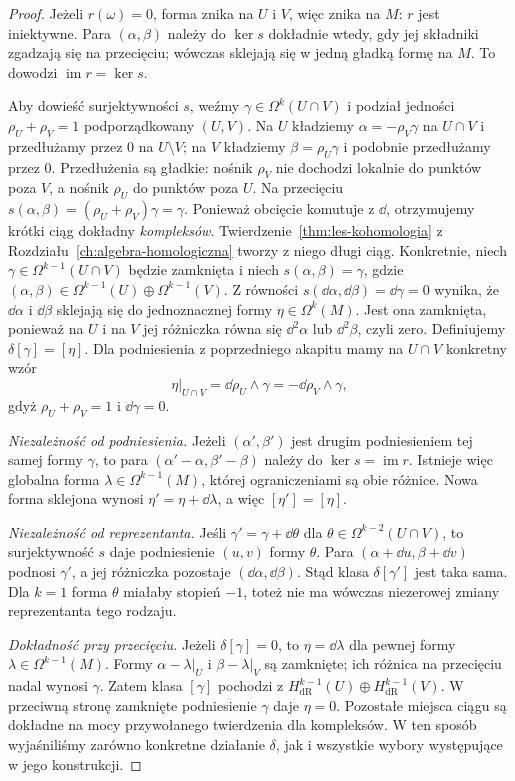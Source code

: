 \begin{proof}
Jeżeli $r(\omega)=0$, forma znika na $U$ i $V$,
więc znika na $M$: $r$ jest iniektywne.
Para $(\alpha,\beta)$ należy do $\ker s$ dokładnie
wtedy, gdy jej składniki zgadzają się na przecięciu;
wówczas sklejają się w jedną gładką formę na $M$.
To dowodzi $\operatorname{im}r=\ker s$.

Aby dowieść surjektywności $s$, weźmy
$\gamma\in\Omega^k(U\cap V)$ i podział jedności
$\rho_U+\rho_V=1$ podporządkowany $(U,V)$.
Na $U$ kładziemy $\alpha=-\rho_V\gamma$ na
$U\cap V$ i przedłużamy przez $0$ na $U\setminus V$;
na $V$ kładziemy $\beta=\rho_U\gamma$
i podobnie przedłużamy przez $0$.
Przedłużenia są gładkie: nośnik $\rho_V$ nie
dochodzi lokalnie do punktów poza $V$, a nośnik
$\rho_U$ do punktów poza $U$. Na przecięciu
$s(\alpha,\beta)=(\rho_U+\rho_V)\gamma=\gamma$.
Ponieważ obcięcie komutuje z $\dd$, otrzymujemy
krótki ciąg dokładny \emph{kompleksów}.
Twierdzenie~\ref{thm:les-kohomologia} z
Rozdziału~\ref{ch:algebra-homologiczna} tworzy
z niego długi ciąg. Konkretnie, niech
$\gamma\in\Omega^{k-1}(U\cap V)$ będzie zamknięta
i niech $s(\alpha,\beta)=\gamma$, gdzie
$(\alpha,\beta)\in
\Omega^{k-1}(U)\oplus\Omega^{k-1}(V)$.
Z równości $s(\dd\alpha,\dd\beta)
=\dd\gamma=0$ wynika, że
$\dd\alpha$ i $\dd\beta$ sklejają się
do jednoznacznej formy $\eta\in\Omega^k(M)$.
Jest ona zamknięta, ponieważ na $U$ i na $V$
jej różniczka równa się $\dd^2\alpha$ lub
$\dd^2\beta$, czyli zero. Definiujemy
$\delta[\gamma]=[\eta]$.
Dla podniesienia z poprzedniego akapitu mamy
na $U\cap V$ konkretny wzór
\[
 \eta|_{U\cap V}
 =\dd\rho_U\wedge\gamma
 =-\dd\rho_V\wedge\gamma,
\]
gdyż $\rho_U+\rho_V=1$ i $\dd\gamma=0$.

\emph{Niezależność od podniesienia.}
Jeżeli $(\alpha',\beta')$ jest drugim
podniesieniem tej samej formy $\gamma$,
to para $(\alpha'-\alpha,\beta'-\beta)$
należy do $\ker s=\operatorname{im}r$.
Istnieje więc globalna forma
$\lambda\in\Omega^{k-1}(M)$, której
ograniczeniami są obie różnice.
Nowa forma sklejona wynosi
$\eta'=\eta+\dd\lambda$,
a więc $[\eta']=[\eta]$.

\emph{Niezależność od reprezentanta.}
Jeśli $\gamma'=\gamma+\dd\theta$ dla
$\theta\in\Omega^{k-2}(U\cap V)$,
to surjektywność $s$ daje podniesienie
$(u,v)$ formy $\theta$. Para
$(\alpha+\dd u,\beta+\dd v)$ podnosi
$\gamma'$, a jej różniczka pozostaje
$(\dd\alpha,\dd\beta)$.
Stąd klasa $\delta[\gamma']$ jest taka
sama. Dla $k=1$ forma $\theta$ miałaby
stopień $-1$, toteż nie ma wówczas
niezerowej zmiany reprezentanta tego rodzaju.

\emph{Dokładność przy przecięciu.}
Jeżeli $\delta[\gamma]=0$, to
$\eta=\dd\lambda$ dla pewnej formy
$\lambda\in\Omega^{k-1}(M)$.
Formy $\alpha-\lambda|_U$ i
$\beta-\lambda|_V$ są zamknięte;
ich różnica na przecięciu nadal
wynosi $\gamma$. Zatem klasa
$[\gamma]$ pochodzi z
$H^{k-1}_{\mathrm{dR}}(U)\oplus
H^{k-1}_{\mathrm{dR}}(V)$.
W przeciwną stronę zamknięte
podniesienie $\gamma$ daje $\eta=0$.
Pozostałe miejsca ciągu są dokładne na mocy
przywołanego twierdzenia dla kompleksów.
W ten sposób wyjaśniliśmy zarówno
konkretne działanie $\delta$, jak i wszystkie
wybory występujące w jego konstrukcji.
\end{proof}

